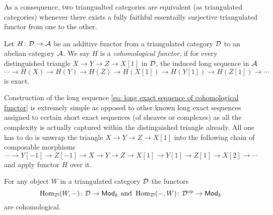 As a consequence, two triangualted categories are equivalent (as triangulated categories) whenever there exists a fully faithful essentailly surjective triangulated functor from one to the other. 

\begin{definition}
    Let $H\colon \mathcal D \to \mathcal A$ be an additive functor from a triangulated category $\mathcal D$ to an abelian category $\mathcal A$. We say $H$ is a \emph{cohomological functor}, if for every distinguished triangle $X \to Y \to Z \to X[1]$ in $\mathcal D$, the induced long sequence in $\mathcal A$
    \begin{equation}
        \label{eq: long exact sequence of cohomological functor}
        \cdots \to H(X) \to H(Y) \to H(Z) \to H(X[1]) \to H(Y[1]) \to H(Z[1]) \to \cdots
    \end{equation}
    is exact.
\end{definition}

Construction of the long sequence \eqref{eq: long exact sequence of cohomological functor} is extremely simple as opposed to other known long exact sequences assigned to certain short exact sequences (\eg of sheaves or complexes) as all the complexity is actually captured within the distinguished triangle already. All one has to do is unwrap the triangle $X \to Y \to Z \to X[1]$ into the following chain of composable morphisms
\[
    \cdots \to Y[-1] \to Z[-1] \to X \to Y \to Z \to X[1] \to Y[1] \to Z[1] \to X[2] \to \cdots
\]
and apply functor $H$ over it. 

\begin{example}
    \label{partial homs are cohomological functors}
    For any object $W$ in a triangulated category $\mathcal D$ the functors 
    \[
    \operatorname{Hom}_\mathcal D(W, -) \colon \mathcal D \to \mathsf{Mod}_{k} \text{ and } \operatorname{Hom}_\mathcal D( - , W) \colon \mathcal D^{\text{op}} \to \mathsf{Mod}_{k}
    \]
    are cohomological.
\end{example}
